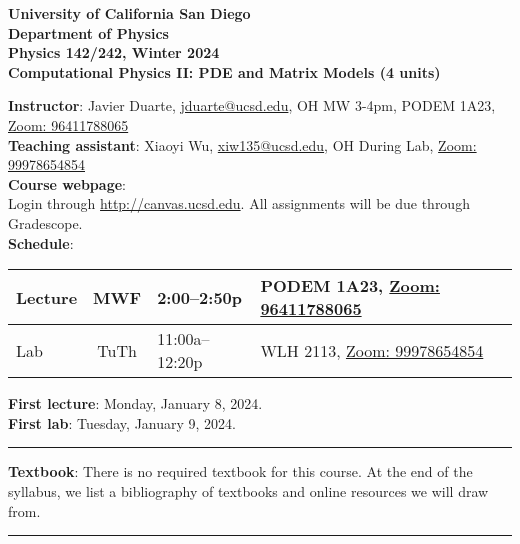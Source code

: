 \documentclass[12pt]{article}
\begin{document}
\begin{center}
  \textbf{
    University of California San Diego\\
    Department of Physics\\
    Physics 142/242, Winter 2024\\
    Computational Physics II: PDE and Matrix Models (4 units)
  }
\end{center}

\noindent\textbf{Instructor}: Javier Duarte, \href{mailto:jduarte@ucsd.edu}{jduarte@ucsd.edu}, OH MW 3-4pm, PODEM 1A23, \href{https://ucsd.zoom.us/j/96411788065}{Zoom: 96411788065}\\
\noindent \textbf{Teaching assistant}: Xiaoyi Wu, \href{mailto:xiw135@ucsd.edu}{xiw135@ucsd.edu}, OH During Lab, \href{https://ucsd.zoom.us/j/99978654854}{Zoom: 99978654854}\\

\noindent\textbf{Course webpage}:\\
\hspace*{1cm}Login through \href{http://canvas.ucsd.edu}{http://canvas.ucsd.edu}.
All assignments will be due through Gradescope.\\

\noindent\textbf{Schedule}:
\begin{center}
  \begin{tabular}{|l|c|l|m{90mm}|}
    \hline
    Lecture & MWF  & 2:00--2:50p    & PODEM 1A23, \href{https://ucsd.zoom.us/j/96411788065}{Zoom: 96411788065} \\\hline
    Lab     & TuTh & 11:00a--12:20p & WLH 2113, \href{https://ucsd.zoom.us/j/99978654854}{Zoom: 99978654854}   \\\hline\end{tabular}
\end{center}

\noindent\textbf{First lecture}: Monday, January 8, 2024.\\
\textbf{First lab}: Tuesday, January 9, 2024.

\begin{center}
  \rule{\textwidth}{0.5pt}
\end{center}

\noindent\textbf{Textbook}: There is no required textbook for this course.
At the end of the syllabus, we list a bibliography of textbooks and online resources we will draw from.

\begin{center}
  \rule{\textwidth}{0.5pt}
\end{center}
\end{document}
